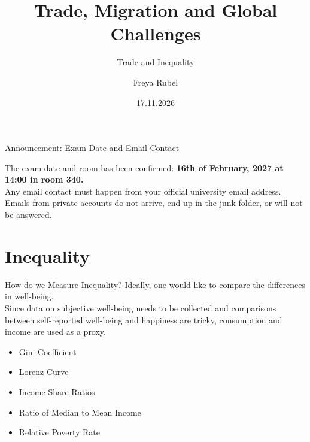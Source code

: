 \documentclass{beamer}
\author{Freya Rubel}
\title{Trade, Migration and Global Challenges}
\subtitle{Trade and Inequality}
\institute{}
\date{17.11.2026}
\begin{document}
\begin{frame}
    \titlepage
\end{frame}

\begin{frame}{Announcement: Exam Date and Email Contact}
    \begin{tcolorbox}[colback=red!15, colframe=red!70!black]
        The exam date and room has been confirmed: \textbf{16th of February, 2027 at 14:00 in room 340.} \vspace{0.3cm}\\
        Any email contact must happen from your official university email address. Emails from private accounts do not arrive, end up in the junk folder, or will not be answered.
    \end{tcolorbox}
\end{frame}

\begin{frame}
    \tableofcontents[sectionstyle=show, subsectionstyle=show/shaded/hide, subsubsectionstyle=show/shaded/hide]
\end{frame}
\section{Inequality}

\begin{frame}{How do we Measure Inequality?}
Ideally, one would like to compare the differences in well-being. \pause \\ Since data on subjective well-being needs to be collected and comparisons between self-reported well-being and happiness are tricky, consumption and income are used as a proxy. 
    \begin{itemize}
        \item Gini Coefficient
        \item Lorenz Curve
        \item Income Share Ratios
        \item Ratio of Median to Mean Income
        \item Relative Poverty Rate 
    \end{itemize}
\end{frame}
\end{document}
